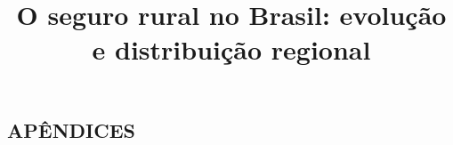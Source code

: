 \documentclass[10pt]{article}
\title{O seguro rural no Brasil: evolução e distribuição regional}
\date{}
\begin{document}
\maketitle

\begin{abstract}

\end{abstract}



%

\begin{singlespace}
\begin{flushleft}
\renewcommand\refname{}
\vspace*{-1.5cm}

\end{flushleft}
\end{singlespace}


\newpage
{}
\begin{center}
\section*{APÊNDICES} 
\end{center}

\begin{singlespace}
 \label{apendice_A}
\end{singlespace}
\noindent
\begin{small}
\linespread{0.86}

\end{small}

%
\end{document}
